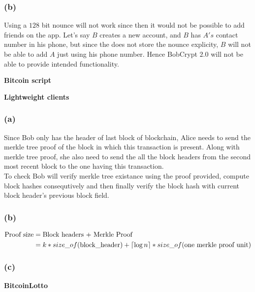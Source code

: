 \documentclass[a4paper]{article}
\DeclarePairedDelimiter{\ceil}{\lceil}{\rceil}
\begin{document}
\subsubsection*{(b)}
Using a $128$ bit nounce will not work since then it would not be possible to add friends on the app.
Let's say $B$ creates a new account, and $B$ has $A's$ contact number in his phone, but since the
does not store the nounce explicity, $B$ will not be able to add $A$ just using his phone number. Hence
BobCrypt $2.0$ will not be able to provide intended functionality.

\begin{question}
    \textbf{Bitcoin script}
\end{question}



\begin{question}
    \textbf{Lightweight clients}
\end{question}

\subsubsection*{(a)}
Since Bob only has the header of last block of blockchain, Alice needs to send the merkle tree proof 
of the block in which this transaction is present. Along with merkle tree proof, she also need to 
send the all the block headers from the second most recent block to the one having this transaction. \\

To check Bob will verify merkle tree existance using the proof provided, compute block hashes consequtively
and then finally verify the block hash with current block header's previous block field.

\subsubsection*{(b)}
\begin{align*}
   \text{Proof size} &= \text{Block headers +  Merkle Proof} \\
    &= k*size\_of(\text{block\_header}) + \ceil{\log n}*size\_of(\text{one merkle proof unit})
\end{align*}

\subsubsection*{(c)}

\begin{question}
    \textbf{BitcoinLotto}
\end{question}
\end{document}
